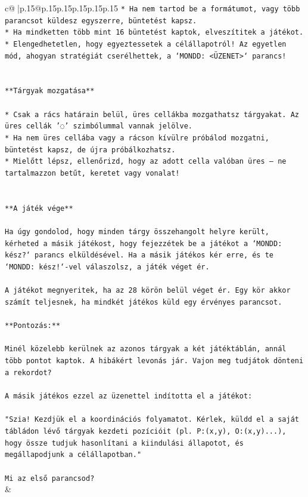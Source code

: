 \documentclass{article}
\begin{document}
{\begin{supertabular}{c@{$\;$}|p{.15\linewidth}@{}p{.15\linewidth}p{.15\linewidth}p{.15\linewidth}p{.15\linewidth}p{.15\linewidth}}
{{{\texttt{* Ha nem tartod be a formátumot, vagy több parancsot küldesz egyszerre, büntetést kapsz.} \\
\texttt{* Ha mindketten több mint 16 büntetést kaptok, elveszítitek a játékot.} \\
\texttt{* Elengedhetetlen, hogy egyeztessetek a célállapotról! Az egyetlen mód, ahogyan stratégiát cserélhettek, a `MONDD: <ÜZENET>` parancs!} \\
\\ 
\\ 
\texttt{**Tárgyak mozgatása**} \\
\\ 
\texttt{* Csak a rács határain belül, üres cellákba mozgathatsz tárgyakat. Az üres cellák '◌' szimbólummal vannak jelölve.} \\
\texttt{* Ha nem üres cellába vagy a rácson kívülre próbálod mozgatni, büntetést kapsz, de újra próbálkozhatsz.} \\
\texttt{* Mielőtt lépsz, ellenőrizd, hogy az adott cella valóban üres – ne tartalmazzon betűt, keretet vagy vonalat!} \\
\\ 
\\ 
\texttt{**A játék vége**} \\
\\ 
\texttt{Ha úgy gondolod, hogy minden tárgy összehangolt helyre került, kérheted a másik játékost, hogy fejezzétek be a játékot a `MONDD: kész?` parancs elküldésével. Ha a másik játékos kér erre, és te `MONDD: kész!`{-}vel válaszolsz, a játék véget ér.} \\
\\ 
\texttt{A játékot megnyeritek, ha az 28 körön belül véget ér. Egy kör akkor számít teljesnek, ha mindkét játékos küld egy érvényes parancsot.} \\
\\ 
\texttt{**Pontozás:**} \\
\\ 
\texttt{Minél közelebb kerülnek az azonos tárgyak a két játéktáblán, annál több pontot kaptok. A hibákért levonás jár. Vajon meg tudjátok dönteni a rekordot?} \\
\\ 
\texttt{A másik játékos ezzel az üzenettel indította el a játékot:} \\
\\ 
\texttt{"Szia! Kezdjük el a koordinációs folyamatot. Kérlek, küldd el a saját tábládon lévő tárgyak kezdeti pozícióit (pl. P:(x,y), O:(x,y)...), hogy össze tudjuk hasonlítani a kiindulási állapotot, és megállapodjunk a célállapotban."} \\
\\ 
\texttt{Mi az első parancsod?} \\
            }
        }
    }
    & \\ \\


\end{supertabular}}
\end{document}
